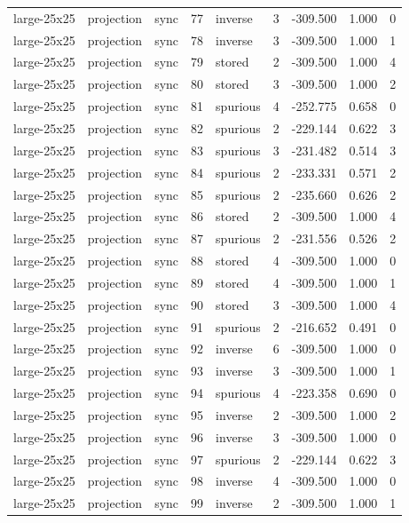 \begin{tabular}{lllrlrrrr}
large-25x25 & projection & sync & 77 & inverse & 3 & -309.500 & 1.000 & 0 \\
large-25x25 & projection & sync & 78 & inverse & 3 & -309.500 & 1.000 & 1 \\
large-25x25 & projection & sync & 79 & stored & 2 & -309.500 & 1.000 & 4 \\
large-25x25 & projection & sync & 80 & stored & 3 & -309.500 & 1.000 & 2 \\
large-25x25 & projection & sync & 81 & spurious & 4 & -252.775 & 0.658 & 0 \\
large-25x25 & projection & sync & 82 & spurious & 2 & -229.144 & 0.622 & 3 \\
large-25x25 & projection & sync & 83 & spurious & 3 & -231.482 & 0.514 & 3 \\
large-25x25 & projection & sync & 84 & spurious & 2 & -233.331 & 0.571 & 2 \\
large-25x25 & projection & sync & 85 & spurious & 2 & -235.660 & 0.626 & 2 \\
large-25x25 & projection & sync & 86 & stored & 2 & -309.500 & 1.000 & 4 \\
large-25x25 & projection & sync & 87 & spurious & 2 & -231.556 & 0.526 & 2 \\
large-25x25 & projection & sync & 88 & stored & 4 & -309.500 & 1.000 & 0 \\
large-25x25 & projection & sync & 89 & stored & 4 & -309.500 & 1.000 & 1 \\
large-25x25 & projection & sync & 90 & stored & 3 & -309.500 & 1.000 & 4 \\
large-25x25 & projection & sync & 91 & spurious & 2 & -216.652 & 0.491 & 0 \\
large-25x25 & projection & sync & 92 & inverse & 6 & -309.500 & 1.000 & 0 \\
large-25x25 & projection & sync & 93 & inverse & 3 & -309.500 & 1.000 & 1 \\
large-25x25 & projection & sync & 94 & spurious & 4 & -223.358 & 0.690 & 0 \\
large-25x25 & projection & sync & 95 & inverse & 2 & -309.500 & 1.000 & 2 \\
large-25x25 & projection & sync & 96 & inverse & 3 & -309.500 & 1.000 & 0 \\
large-25x25 & projection & sync & 97 & spurious & 2 & -229.144 & 0.622 & 3 \\
large-25x25 & projection & sync & 98 & inverse & 4 & -309.500 & 1.000 & 0 \\
large-25x25 & projection & sync & 99 & inverse & 2 & -309.500 & 1.000 & 1 \\

\end{tabular}
